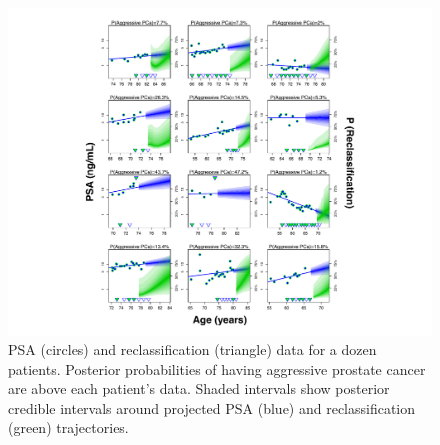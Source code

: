 \documentclass[12pt, letterpaper]{article}
\begin{document}
\begin{figure}
\begin{center}
\includegraphics[width=\textwidth]{data-and-predictions.pdf}
\caption{PSA (circles) and reclassification (triangle) data for a dozen patients. Posterior probabilities of having aggressive prostate cancer are above each patient's data. Shaded intervals show posterior credible intervals around projected PSA (blue) and reclassification (green) trajectories. }
\label{fig:singles}
\end{center}
\end{figure}
\end{document}
